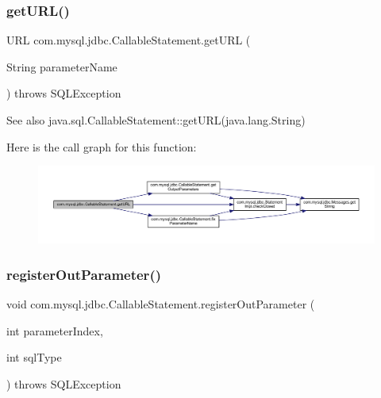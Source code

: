 \subsubsection{\texorpdfstring{get\+U\+R\+L()}{getURL()}\hspace{0.1cm}{\footnotesize\ttfamily [2/2]}}
{\footnotesize\ttfamily U\+RL com.\+mysql.\+jdbc.\+Callable\+Statement.\+get\+U\+RL (\begin{DoxyParamCaption}\item[{String}]{parameter\+Name }\end{DoxyParamCaption}) throws S\+Q\+L\+Exception}

\begin{DoxySeeAlso}{See also}
java.\+sql.\+Callable\+Statement\+::get\+U\+RL(java.\+lang.\+String) 
\end{DoxySeeAlso}
Here is the call graph for this function\+:\nopagebreak
\begin{figure}[H]
\begin{center}
\leavevmode
\includegraphics[width=350pt]{classcom_1_1mysql_1_1jdbc_1_1_callable_statement_acd2ed833e20cc8a73e5723bde7bfb394_cgraph}
\end{center}
\end{figure}
\mbox{\label{classcom_1_1mysql_1_1jdbc_1_1_callable_statement_a5158af0506cf90040062b2049550f59b}} 
\subsubsection{\texorpdfstring{register\+Out\+Parameter()}{registerOutParameter()}\hspace{0.1cm}{\footnotesize\ttfamily [1/6]}}
{\footnotesize\ttfamily void com.\+mysql.\+jdbc.\+Callable\+Statement.\+register\+Out\+Parameter (\begin{DoxyParamCaption}\item[{int}]{parameter\+Index,  }\item[{int}]{sql\+Type }\end{DoxyParamCaption}) throws S\+Q\+L\+Exception}


